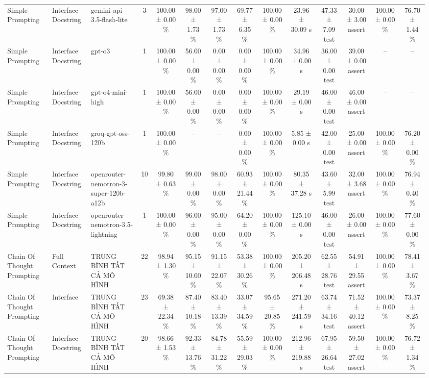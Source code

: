 \begin{table}[htbp]
\begin{tabular}{lllccccccccccc}
Simple Prompting & Interface Docstring & gemini-api-3.5-flash-lite & 3 & 100.00 ± 0.00 \% & 98.00 ± 1.73 \% & 97.00 ± 1.73 \% & 69.77 ± 6.35 \% & 100.00 ± 0.00 \% & 23.96 ± 30.09 s & 47.33 ± 7.09 test & 30.00 ± 3.00 assert & 100.00 ± 0.00 \% & 76.70 ± 1.44 \% \\
Simple Prompting & Interface Docstring & gpt-o3 & 1 & 100.00 ± 0.00 \% & 56.00 ± 0.00 \% & 0.00 ± 0.00 \% & 0.00 ± 0.00 \% & 100.00 ± 0.00 \% & 34.96 ± 0.00 s & 36.00 ± 0.00 test & 39.00 ± 0.00 assert & – & – \\
Simple Prompting & Interface Docstring & gpt-o4-mini-high & 1 & 100.00 ± 0.00 \% & 56.00 ± 0.00 \% & 0.00 ± 0.00 \% & 0.00 ± 0.00 \% & 100.00 ± 0.00 \% & 29.19 ± 0.00 s & 46.00 ± 0.00 test & 46.00 ± 0.00 assert & – & – \\
Simple Prompting & Interface Docstring & groq-gpt-oss-120b & 1 & 100.00 ± 0.00 \% & – & – & 0.00 ± 0.00 \% & 100.00 ± 0.00 \% & 5.85 ± 0.00 s & 42.00 ± 0.00 test & 25.00 ± 0.00 assert & 100.00 ± 0.00 \% & 76.20 ± 0.00 \% \\
Simple Prompting & Interface Docstring & openrouter-nemotron-3-super-120b-a12b & 10 & 99.80 ± 0.63 \% & 99.00 ± 0.00 \% & 98.00 ± 0.00 \% & 60.93 ± 21.44 \% & 100.00 ± 0.00 \% & 80.35 ± 37.28 s & 43.60 ± 5.99 test & 32.00 ± 3.68 assert & 100.00 ± 0.00 \% & 76.94 ± 0.40 \% \\
Simple Prompting & Interface Docstring & openrouter-nemotron-3.5-lightning & 1 & 100.00 ± 0.00 \% & 96.00 ± 0.00 \% & 95.00 ± 0.00 \% & 64.20 ± 0.00 \% & 100.00 ± 0.00 \% & 125.10 ± 0.00 s & 46.00 ± 0.00 test & 26.00 ± 0.00 assert & 100.00 ± 0.00 \% & 77.60 ± 0.00 \% \\
Chain Of Thought Prompting & Full Context & TRUNG BÌNH TẤT CẢ MÔ HÌNH & 22 & 98.94 ± 1.30 \% & 95.15 ± 10.00 \% & 91.15 ± 22.07 \% & 53.38 ± 30.26 \% & 100.00 ± 0.00 \% & 205.20 ± 206.48 s & 62.55 ± 28.76 test & 54.91 ± 29.55 assert & 100.00 ± 0.00 \% & 78.41 ± 3.67 \% \\
Chain Of Thought Prompting & Interface & TRUNG BÌNH TẤT CẢ MÔ HÌNH & 23 & 69.38 ± 22.34 \% & 87.40 ± 10.18 \% & 83.40 ± 13.39 \% & 33.07 ± 34.59 \% & 95.65 ± 20.85 \% & 271.20 ± 241.59 s & 63.74 ± 34.16 test & 71.52 ± 40.12 assert & 100.00 ± 0.00 \% & 73.37 ± 8.25 \% \\
Chain Of Thought Prompting & Interface Docstring & TRUNG BÌNH TẤT CẢ MÔ HÌNH & 20 & 98.66 ± 1.53 \% & 92.33 ± 13.76 \% & 84.78 ± 31.22 \% & 55.59 ± 29.03 \% & 100.00 ± 0.00 \% & 212.96 ± 219.88 s & 67.95 ± 26.64 test & 59.50 ± 27.02 assert & 100.00 ± 0.00 \% & 76.72 ± 1.34 \% \\

\end{tabular}
\end{table}
